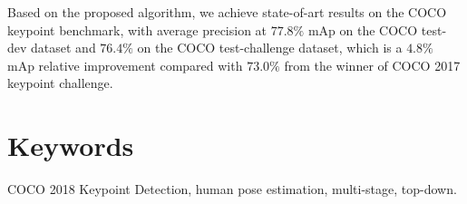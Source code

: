 \documentclass[oneside]{memoir}
\begin{document}
Based on the proposed algorithm, we achieve state-of-art results on the COCO keypoint benchmark, with average
precision at $77.8\%$ mAp on the COCO test-dev dataset and $76.4\%$ on the COCO test-challenge dataset, which is a $4.8\%$ mAp
relative improvement compared with $73.0\%$ from the winner of COCO 2017 keypoint challenge.

\section*{Keywords}
COCO 2018 Keypoint Detection, human pose estimation, multi-stage, top-down.


\setcounter{page}{1}

















\appendix

% 
\end{document}
